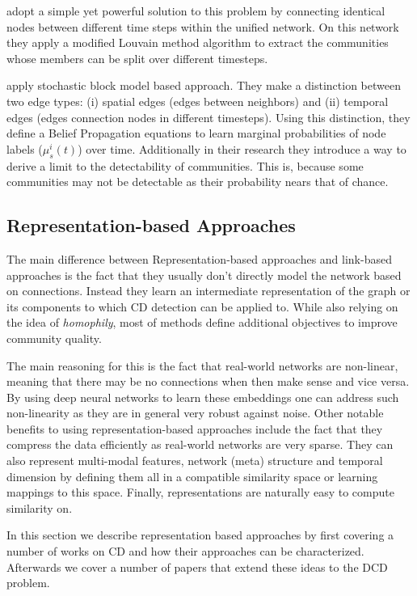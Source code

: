 \documentclass[
acmsmall,
nonacm,
screen,
acmthm]{../../scripts/pandoc/templates/acmart}
\begin{document}
\citet{muchaCommunityStructureTimeDependent2009} adopt a simple yet
powerful solution to this problem by connecting identical nodes between
different time steps within the unified network. On this network they
apply a modified Louvain method algorithm to extract the communities
whose members can be split over different timesteps.

\citet{ghasemianDetectabilityThresholdsOptimal2016} apply stochastic
block model based approach. They make a distinction between two edge
types: (i) spatial edges (edges between neighbors) and (ii) temporal
edges (edges connection nodes in different timesteps). Using this
distinction, they define a Belief Propagation equations to learn
marginal probabilities of node labels (\(\mu^i_s(t)\)) over time.
Additionally in their research they introduce a way to derive a limit to
the detectability of communities. This is, because some communities may
not be detectable as their probability nears that of chance.

\hypertarget{representation-based-approaches}{%
\subsection{Representation-based
Approaches}\label{representation-based-approaches}}

The main difference between Representation-based approaches and
link-based approaches is the fact that they usually don't directly model
the network based on connections. Instead they learn an intermediate
representation of the graph or its components to which CD detection can
be applied to. While also relying on the idea of \emph{homophily}, most
of methods define additional objectives to improve community quality.

The main reasoning for this is the fact that real-world networks are
non-linear, meaning that there may be no connections when then make
sense and vice versa. By using deep neural networks to learn these
embeddings one can address such non-linearity as they are in general
very robust against noise. Other notable benefits to using
representation-based approaches include the fact that they compress the
data efficiently as real-world networks are very sparse. They can also
represent multi-modal features, network (meta) structure and temporal
dimension by defining them all in a compatible similarity space or
learning mappings to this space. Finally, representations are naturally
easy to compute similarity on.

In this section we describe representation based approaches by first
covering a number of works on CD and how their approaches can be
characterized. Afterwards we cover a number of papers that extend these
ideas to the DCD problem.
\end{document}

